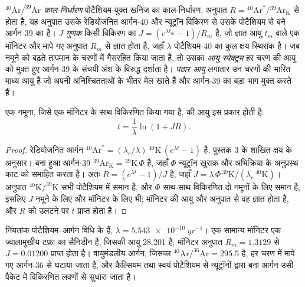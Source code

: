 \begin{definition}[आर्गन--आर्गन काल-निर्धारण, J गुणक, आयु स्पेक्ट्रम, पठार आयु]
\label{def:b3:advanced-geochronology:arar}
\emph{$^{40}\mathrm{Ar}/^{39}\mathrm{Ar}$ काल-निर्धारण}
पोटैशियम-युक्त खनिज का काल-निर्धारण, अनुपात $R =
{}^{40}\mathrm{Ar}^*/{}^{39}\mathrm{Ar}_{\mathrm K}$ से होता है, यह अनुपात उसके रेडियोजनित
आर्गन-40 और न्यूट्रॉन विकिरण से उसके पोटैशियम से बने आर्गन-39 का है।
\emph{J गुणक} किसी विकिरण का $J = (e^{\lambda
t_m} - 1)/R_m$ है, जो ज्ञात आयु $t_m$ वाले एक मॉनिटर और मापे गए अनुपात $R_m$ से ज्ञात होता है,
जहाँ $\lambda$ पोटैशियम-40 का कुल क्षय-स्थिरांक है। जब नमूने को
बढ़ते तापमान के चरणों में गैसरहित किया जाता है, तो उसका \emph{आयु
स्पेक्ट्रम} हर चरण की आयु को मुक्त हुए आर्गन-39 के संचयी
अंश के विरुद्ध दर्शाता है। \emph{पठार
आयु} लगातार उन चरणों की भारित माध्य आयु है जो
अपनी अनिश्चितताओं के भीतर मेल खाते हैं और आर्गन-39 का बड़ा भाग मुक्त करते हैं।
\end{definition}

\begin{theorem}[आर्गन--आर्गन आयु]\label{thm:b3:advanced-geochronology:arar}
एक नमूना, जिसे एक मॉनिटर के साथ विकिरणित किया गया है, की आयु इस प्रकार होती है:
\[
t = \frac1\lambda\ln(1 + JR).
\]
\end{theorem}

\begin{proof}
रेडियोजनित आर्गन $^{40}\mathrm{Ar}^* = (\lambda_e/\lambda)\,
{}^{40}\mathrm{K}\,(e^{\lambda t} - 1)$ है, पुस्तक 3 के शाखित क्षय के
अनुसार। बना हुआ आर्गन-39 $^{39}\mathrm{Ar}_{\mathrm K} =
{}^{39}\mathrm{K}\,\Phi$ है, जहाँ $\Phi$ न्यूट्रॉन खुराक और अभिक्रिया के
अनुप्रस्थ काट को समाहित करता है। अतः $R = (e^{\lambda t} - 1)/J$ है, जहाँ $J =
\lambda\,\Phi\,{}^{39}\mathrm{K}/(\lambda_e\,{}^{40}\mathrm{K})$। अनुपात
$^{40}\mathrm{K}/^{39}\mathrm{K}$ सभी पोटैशियम में समान है, और $\Phi$
साथ-साथ विकिरणित दो नमूनों के लिए समान है, इसलिए $J$ नमूने के लिए
और मॉनिटर के लिए भी; मॉनिटर की आयु और अनुपात से वह ज्ञात होता है, और $R$ को
उलटने पर $t$ प्राप्त होता है।
\end{proof}

नियतांक पोटैशियम--आर्गन विधि के हैं, $\lambda =
\qty{5.543e-10}{yr^{-1}}$। एक सामान्य मॉनिटर एक ज्वालामुखीय टफ़ा का सैनिडीन है, जिसकी आयु
\qty{28.201}{\Ma} है; मॉनिटर अनुपात $R_m = 1.3129$ से $J =
0.01200$ प्राप्त होता है। वायुमंडलीय आर्गन, जिसका $^{40}\mathrm{Ar}/^{36}\mathrm{Ar} = 295.5$ है,
हर चरण में मापे गए आर्गन-36 से घटाया जाता है, और कैल्सियम तथा स्वयं पोटैशियम से
न्यूट्रॉनों द्वारा बना आर्गन उसी पैकेट में विकिरणित लवणों से
सुधारा जाता है।

